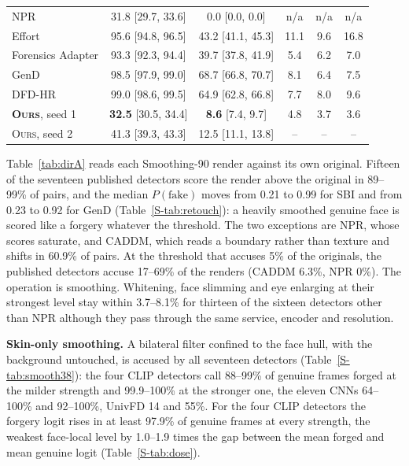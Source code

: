 \documentclass[conference]{IEEEtran}
\newcommand{\ours}{\textsc{Ours}}
\begin{document}
\begin{table}[t]
\begin{tabular}{@{}l cc ccc@{}}
NPR & 31.8 [29.7, 33.6] & 0.0 [0.0, 0.0] & n/a & n/a & n/a \\
Effort & 95.6 [94.8, 96.5] & 43.2 [41.1, 45.3] & 11.1 & 9.6 & 16.8 \\
Forensics Adapter & 93.3 [92.3, 94.4] & 39.7 [37.8, 41.9] & 5.4 & 6.2 & 7.0 \\
GenD & 98.5 [97.9, 99.0] & 68.7 [66.8, 70.7] & 8.1 & 6.4 & 7.5 \\
DFD-HR & 99.0 [98.6, 99.5] & 64.9 [62.8, 66.8] & 7.7 & 8.0 & 9.6 \\
\midrule
\textbf{\ours{}}, seed 1 & \textbf{32.5} [30.5, 34.4] & \textbf{8.6} [7.4, 9.7] & 4.8 & 3.7 & 3.6 \\
\ours{}, seed 2 & 41.3 [39.3, 43.3] & 12.5 [11.1, 13.8] & -- & -- & -- \\
\bottomrule
\end{tabular}
\end{table}

Table~\ref{tab:dirA} reads each Smoothing-90 render against its own original. Fifteen of the seventeen published detectors
score the render above the original in 89--99\% of pairs, and the median $P(\text{fake})$ moves from 0.21 to 0.99 for SBI
and from 0.23 to 0.92 for GenD (Table~\ref{S-tab:retouch}):
a heavily smoothed genuine face is scored like a forgery whatever the threshold. The two exceptions are NPR, whose scores
saturate, and CADDM, which reads a boundary rather than texture and shifts in 60.9\% of pairs. At the threshold that accuses
5\% of the originals, the published detectors accuse 17--69\% of the renders (CADDM 6.3\%, NPR 0\%).
The operation is smoothing. Whitening, face slimming and eye enlarging at their strongest level stay within 3.7--8.1\% for
thirteen of the sixteen detectors other than NPR
although they pass through the same service, encoder and resolution.

\textbf{Skin-only smoothing.} A bilateral filter confined to the face hull, with the background untouched, is accused by all
seventeen detectors (Table~\ref{S-tab:smooth38}): the four CLIP detectors call 88--99\% of genuine frames forged at the
milder strength and 99.9--100\% at the stronger one, the eleven CNNs 64--100\% and 92--100\%, UnivFD 14 and 55\%.
For the four CLIP detectors the forgery logit rises in at least 97.9\% of genuine frames at every strength, the weakest
face-local level by 1.0--1.9 times the gap between the mean forged and mean genuine logit (Table~\ref{S-tab:dose}).
\end{document}
